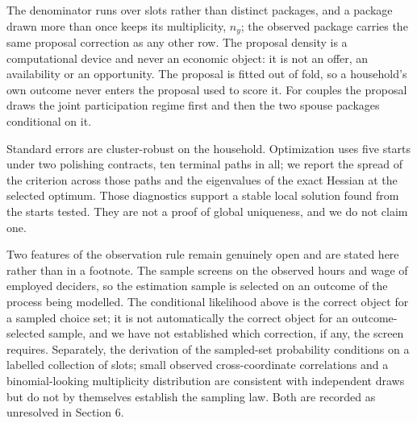 The denominator runs over slots rather than distinct packages, and a package drawn more than once keeps its multiplicity, \(n_y\); the observed package carries the same proposal correction as any other row. The proposal density is a computational device and never an economic object: it is not an offer, an availability or an opportunity. The proposal is fitted out of fold, so a household's own outcome never enters the proposal used to score it. For couples the proposal draws the joint participation regime first and then the two spouse packages conditional on it.

Standard errors are cluster-robust on the household. Optimization uses five starts under two polishing contracts, ten terminal paths in all; we report the spread of the criterion across those paths and the eigenvalues of the exact Hessian at the selected optimum. Those diagnostics support a stable local solution found from the starts tested. They are not a proof of global uniqueness, and we do not claim one.

Two features of the observation rule remain genuinely open and are stated here rather than in a footnote. The sample screens on the observed hours and wage of employed deciders, so the estimation sample is selected on an outcome of the process being modelled. The conditional likelihood above is the correct object for a sampled choice set; it is not automatically the correct object for an outcome-selected sample, and we have not established which correction, if any, the screen requires. Separately, the derivation of the sampled-set probability conditions on a labelled collection of slots; small observed cross-coordinate correlations and a binomial-looking multiplicity distribution are consistent with independent draws but do not by themselves establish the sampling law. Both are recorded as unresolved in Section 6.

